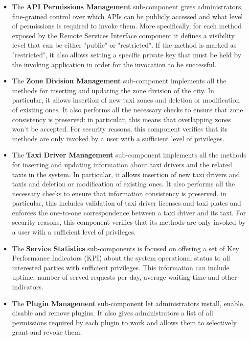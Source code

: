 	\begin{itemize}
		\item The \textbf{API Permissions Management} sub-component gives administrators fine-grained control over which APIs can be publicly accessed and what level of permissions is required to invoke them. More specifically, for each method exposed by the Remote Services Interface component it defines a visibility level that can be either "public" or "restricted". If the method is marked as "restricted", it also allows setting a specific private key that must be held by the invoking application in order for the invocation to be successful. 
		\item The \textbf{Zone Division Management} sub-component implements all the methods for inserting and updating the zone division of the city. In particular, it allows insertion of new taxi zones and deletion or modification of existing ones. It also performs all the necessary checks to ensure that zone consistency is preserved: in particular, this means that overlapping zones won't be accepted. For security reasons, this component verifies that its methods are only invoked by a user with a sufficient level of privileges.
		\item The \textbf{Taxi Driver Management} sub-component implements all the methods for inserting and updating information about taxi drivers and the related taxis in the system. In particular, it allows insertion of new taxi drivers and taxis and deletion or modification of existing ones. It also performs all the necessary checks to ensure that information consistency is preserved. in particular, this includes validation of taxi driver licenses and taxi plates and enforces the one-to-one correspondence between a taxi driver and its taxi. For security reasons, this component verifies that its methods are only invoked by a user with a sufficient level of privileges.
		\item The \textbf{Service Statistics} sub-components is focused on offering a set of Key Performance Indicators (KPI) about the system operational status to all interested parties with sufficient privileges. This information can include uptime, number of served requests per day, average waiting time and other indicators. 
		\item The \textbf{Plugin Management} sub-component let administrators install, enable, disable and remove plugins. It also gives administrators a list of all permissions required by each plugin to work and allows them to selectively grant and revoke them.
	\end{itemize}
	
